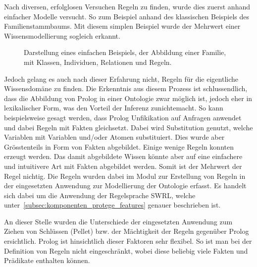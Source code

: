 Nach diversen, erfolglosen Versuchen Regeln zu finden, wurde dies zuerst anhand einfacher Modelle versucht. So zum Beispiel anhand des klassischen Beispiels des Familienstammbaums. Mit diesem simplen Beispiel wurde der Mehrwert einer Wissensmodellierung sogleich erkannt.

\begin{figure}[H]
\centering {}
\caption{Darstellung eines einfachen Beispiels, der Abbildung einer Familie, mit Klassen, Individuen, Relationen und Regeln.\label{fig:familien_netz}\protect\footnotemark}
\end{figure}

Jedoch gelang es auch nach dieser Erfahrung nicht, Regeln für die eigentliche Wissensdomäne zu finden. Die Erkenntnis aus diesem Prozess ist schlussendlich, dass die Abbildung von Prolog in einer Ontologie zwar möglich ist, jedoch eher in lexikalischer Form, was den Vorteil der Inferenz zunichtemacht. So kann beispielsweise gesagt werden, dass Prolog Unfikikation auf Anfragen anwendet und dabei Regeln mit Fakten gleichsetzt. Dabei wird Substitution genutzt, welche Variablen mit Variablen und/oder Atomen substituiert. Dies wurde aber Grösstenteils in Form von Fakten abgebildet. Einige wenige Regeln konnten erzeugt werden. Das damit abgebildete Wissen könnte aber auf eine einfachere und intuitivere Art mit Fakten abgebildet werden. Somit ist der Mehrwert der Regel nichtig. Die Regeln wurden dabei im Modul zur Erstellung von Regeln in der eingesetzten Anwendung zur Modellierung der Ontologie erfasst. Es handelt sich dabei um die Anwendung der Regelsprache SWRL, welche unter~\autoref{subsec:komponenten_protege_features} genauer beschrieben ist.

An dieser Stelle wurden  die Unterschiede der eingesetzten Anwendung zum Ziehen von Schlüssen (Pellet) bzw. der Mächtigkeit der Regeln gegenüber Prolog ersichtlich. Prolog ist hinsichtlich dieser Faktoren sehr flexibel. So ist man bei der Definition von Regeln nicht eingeschränkt, wobei diese beliebig viele Fakten und Prädikate enthalten können.

